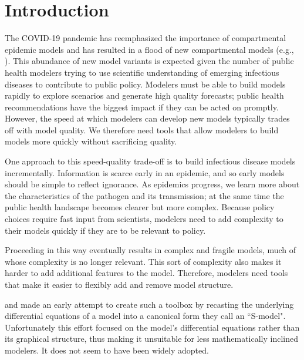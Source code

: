 
\section{Introduction}\label{intro}
The COVID-19 pandemic has reemphasized the importance of compartmental epidemic models \citep{abou2020compartmental, massonis2021structural, adam2020special, currie2020simulation, lofgren2014mathematical, mcbryde2020role, enserink2020covid} and has resulted in a flood of new compartmental models (e.g., \cite{friston2020dynamic, fields2021age, chang2022stochastic, lavielle2020extension, balabdaoui2020age, leontitsis2021seahir, LeviEarn22}). 
This abundance of new model variants is expected given the number of public health modelers trying to use scientific understanding of emerging infectious diseases to contribute to public policy. Modelers must be able to build models rapidly to explore scenarios and generate high quality forecasts; public health recommendations have the biggest impact if they can be acted on promptly. However, the speed at which modelers can develop new models typically trades off with model quality. We therefore need tools that allow modelers to build models more quickly without sacrificing quality. 

One approach to this speed-quality trade-off is to build infectious disease models incrementally. Information is scarce early in an epidemic, and so early models should be simple to reflect ignorance. As epidemics progress, we learn more about the characteristics of the pathogen and its transmission; at the same time the public health landscape becomes clearer but more complex. Because policy choices require fast input from scientists, modelers need to add complexity to their models quickly if they are to be relevant to policy. 

Proceeding in this way eventually results in complex and fragile models, much of whose complexity is no longer relevant. This sort of complexity also makes it harder to add additional features to the model. Therefore, modelers need tools that make it easier to flexibly add and remove model structure.

\cite{savageau1988introduction} and \cite{voit1988recasting, voit1990s} made an early attempt to create such a toolbox by recasting the underlying differential equations of a model into a canonical form they call an ``S-model". Unfortunately this effort focused on the model's differential equations rather than its graphical structure, thus making it unsuitable for less mathematically inclined modelers. It does not seem to have been widely adopted.

